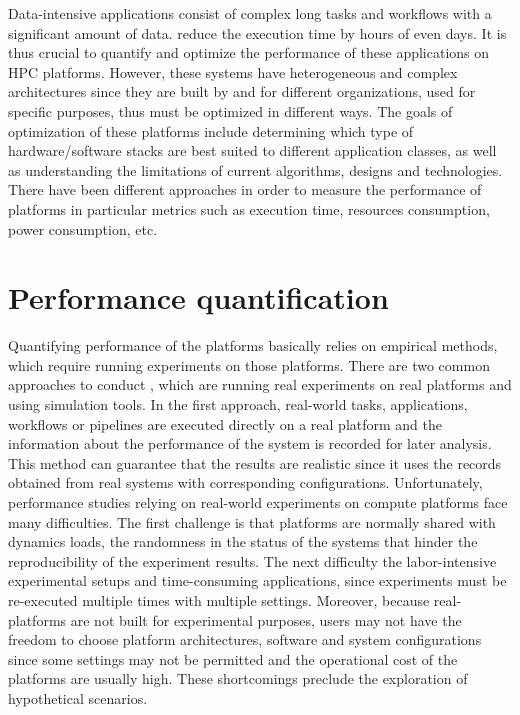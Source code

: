 Data-intensive applications consist of complex long tasks and workflows 
with a significant amount of data. 
 reduce the execution time by hours of even days.
It is thus crucial to quantify and optimize the performance of these applications 
on HPC platforms. 
However, these systems have heterogeneous and complex architectures since they 
are built by and for different organizations, used for specific purposes, thus must be 
optimized in different ways. 
The goals of optimization of these platforms include determining which type of 
hardware/software stacks are best suited to different application classes, 
as well as understanding the limitations of current algorithms, 
designs and technologies. 
There have been different approaches in order to measure the performance 
of platforms in particular metrics such as execution time, 
resources consumption, power consumption, etc. 

\section{Performance quantification}

Quantifying performance of the platforms basically relies on empirical methods, 
which require running experiments on those platforms. 
There are two common approaches to conduct , which are 
running real experiments on real platforms and using simulation tools. 
In the first approach, real-world tasks, applications, workflows or pipelines are executed 
directly on a real platform and the information about the performance of the system 
is recorded for later analysis. 
This method can guarantee that the results are realistic since it uses the records 
obtained from real systems with corresponding configurations.
Unfortunately, performance studies relying on real-world experiments on 
compute platforms face many difficulties.
The first challenge is that platforms are normally shared with dynamics loads,
the randomness in the status of the systems that hinder the reproducibility 
of the experiment results.
The next difficulty  the labor-intensive experimental setups and 
time-consuming applications, since experiments must be re-executed 
multiple times with multiple settings. 
Moreover, because real-platforms are not built for experimental purposes,
users may not have the freedom to choose platform architectures, software and 
system configurations since some settings may not be permitted and the 
operational cost of the platforms are usually high. 
These shortcomings  preclude the exploration of hypothetical scenarios.

